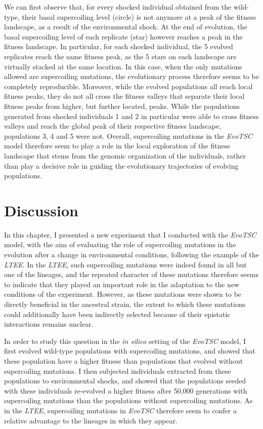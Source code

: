 We can first observe that, for every shocked individual obtained from the wild-type, their basal supercoiling level (circle) is not anymore at a peak of the fitness landscape, as a result of the environmental shock.
At the end of evolution, the basal supercoiling level of each replicate (star) however reaches a peak in the fitness landscape.
In particular, for each shocked individual, the 5 evolved replicates reach the same fitness peak, as the 5 stars on each landscape are virtually stacked at the same location.
In this case, when the only mutations allowed are supercoiling mutations, the evolutionary process therefore seems to be completely reproducible.
Moreover, while the evolved populations all reach local fitness peaks, they do not all cross the fitness valleys that separate their local fitness peaks from higher, but further located, peaks.
While the populations generated from shocked individuals 1 and 2 in particular were able to cross fitness valleys and reach the global peak of their respective fitness landscape, populations 3, 4 and 5 were not.
Overall, supercoiling mutations in the \emph{EvoTSC} model therefore seem to play a role in the local exploration of the fitness landscape that stems from the genomic organization of the individuals, rather than play a decisive role in guiding the evolutionary trajectories of evolving populations.


\section{Discussion}

In this chapter, I presented a new experiment that I conducted with the \emph{EvoTSC} model, with the aim of evaluating the role of supercoiling mutations in the evolution after a change in environmental conditions, following the example of the \emph{LTEE}.
In the \emph{LTEE}, such supercoiling mutations were indeed found in all but one of the lineages, and the repeated character of these mutations therefore seems to indicate that they played an important role in the adaptation to the new conditions of the experiment.
However, as these mutations were shown to be directly beneficial in the ancestral strain, the extent to which these mutations could additionally have been indirectly selected because of their epistatic interactions remains unclear.

In order to study this question in the \emph{in silico} setting of the \emph{EvoTSC} model, I first evolved wild-type populations with supercoiling mutations, and showed that these population have a higher fitness than populations that evolved without supercoiling mutations.
I then subjected individuals extracted from these populations to environmental shocks, and showed that the populations seeded with these individuals re-evolved a higher fitness after 50,000 generations with supercoiling mutations than the populations without supercoiling mutations.
As in the \emph{LTEE}, supercoiling mutations in \emph{EvoTSC} therefore seem to confer a relative advantage to the lineages in which they appear.

